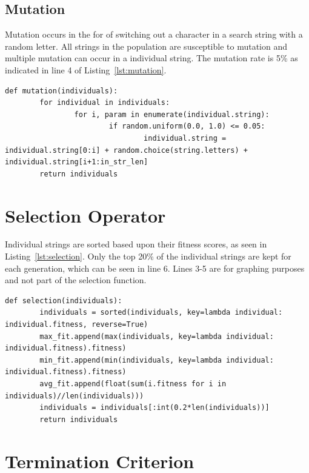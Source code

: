 \documentclass[12pt]{article}
\begin{document}
\subsection{Mutation}

Mutation occurs in the for of switching out a character in a search string with
a random letter.  All strings in the population are susceptible to mutation and
multiple mutation can occur in a individual string.  The mutation rate is 5\% as
indicated in line 4 of Listing~\ref{lst:mutation}.

\begin{lstlisting}[caption = {Mutation Function}, label={lst:mutation}]
def mutation(individuals):
        for individual in individuals:
                for i, param in enumerate(individual.string):
                        if random.uniform(0.0, 1.0) <= 0.05:
                                individual.string = individual.string[0:i] + random.choice(string.letters) + individual.string[i+1:in_str_len]
        return individuals
\end{lstlisting}


\section{Selection Operator}

Individual strings are sorted based upon their fitness scores, as seen in
Listing~\ref{lst:selection}.  Only the top 20\% of the individual strings are
kept for each generation, which can be seen in line 6.  Lines 3-5 are for
graphing purposes and not part of the selection function.

\begin{lstlisting}[caption = {Selection Function}, label = {lst:selection}]
def selection(individuals):
        individuals = sorted(individuals, key=lambda individual: individual.fitness, reverse=True)
        max_fit.append(max(individuals, key=lambda individual: individual.fitness).fitness)
        min_fit.append(min(individuals, key=lambda individual: individual.fitness).fitness)
        avg_fit.append(float(sum(i.fitness for i in individuals)//len(individuals)))
        individuals = individuals[:int(0.2*len(individuals))]
        return individuals
\end{lstlisting}

\section{Termination Criterion}
\end{document}
